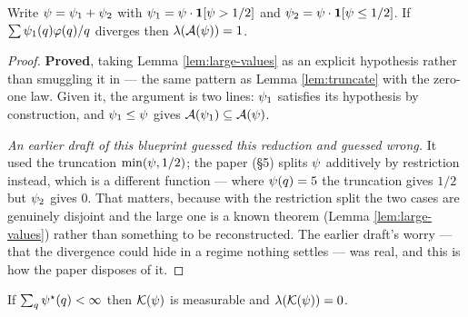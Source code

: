 \begin{lemma}
  \label{lem:truncation-gap}
  \leanok
  Write $\psi = \psi_1 + \psi_2$ with $\psi_1 = \psi \cdot \mathbf{1}[\psi > 1/2]$ and
  $\psi_2 = \psi \cdot \mathbf{1}[\psi \leq 1/2]$. If $\sum \psi_1(q)\varphi(q)/q$ diverges
  then $\lambda(\mathcal{A}(\psi)) = 1$.
\end{lemma}

\begin{proof}
  \leanok
  \textbf{Proved}, taking Lemma \ref{lem:large-values} as an explicit hypothesis rather
  than smuggling it in --- the same pattern as Lemma \ref{lem:truncate} with the zero-one
  law. Given it, the argument is two lines: $\psi_1$ satisfies its hypothesis by
  construction, and $\psi_1 \leq \psi$ gives $\mathcal{A}(\psi_1) \subseteq \mathcal{A}(\psi)$.

  \emph{An earlier draft of this blueprint guessed this reduction and guessed wrong.} It
  used the truncation $\min(\psi, 1/2)$; the paper (\S5) splits $\psi$ additively by
  restriction instead, which is a different function --- where $\psi(q) = 5$ the truncation
  gives $1/2$ but $\psi_2$ gives $0$. That matters, because with the restriction split the
  two cases are genuinely disjoint and the large one is a known theorem
  (Lemma \ref{lem:large-values}) rather than something to be reconstructed. The earlier
  draft's worry --- that the divergence could hide in a regime nothing settles --- was
  real, and this is how the paper disposes of it.
\end{proof}

\begin{theorem}
  \label{thm:two-a}
  \leanok
  If $\sum_q \psi^{\star}(q) < \infty$ then $\mathcal{K}(\psi)$ is measurable and $\lambda(\mathcal{K}(\psi)) = 0$.
\end{theorem}


